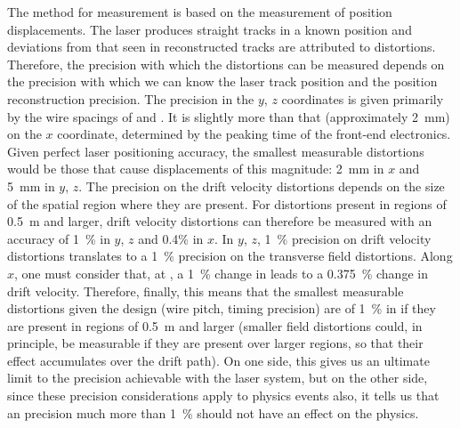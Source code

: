 The method for \efield measurement is based on the measurement of position displacements. The laser produces straight tracks in a known position and deviations from that seen in reconstructed tracks are attributed to \efield distortions. Therefore, the precision with which the \efield distortions can be measured depends on the precision with which we can know the laser track position and the  position reconstruction precision.
The  precision in the $y$, $z$ coordinates is given primarily by the wire spacings of \uvpitch and \xgpitch. It is slightly more than that (approximately \SI{2}{\milli\m}) on the $x$ coordinate, determined by the \fepeaktime peaking time of the front-end electronics.
Given perfect laser positioning accuracy, the smallest measurable \efield distortions would be those that cause displacements of this magnitude: \SI{2}{\milli\m} in $x$ and \SI{5}{\milli\m} in $y$, $z$. The precision on the drift velocity distortions depends on the size of the spatial region where they are present. For distortions present in regions of \SI{0.5}{\m} and larger, drift velocity distortions can therefore be measured with an accuracy of \SI{1}{\%} in $y$, $z$ and \num{0.4}\% in $x$. In $y$, $z$, \SI{1}{\%} precision on drift velocity distortions translates to a \SI{1}{\%} precision on the transverse field distortions. Along $x$, one must consider that, at \spmaxfield, a \SI{1}{\%} change in \efield leads to a \SI{0.375}{\%} change in drift velocity. Therefore, finally, this means that the smallest measurable distortions given the  design (wire pitch, timing precision) are of \SI{1}{\%} in \efield if they are present in regions of \SI{0.5}{\m} and larger (smaller field distortions could, in principle, be measurable if they are present over larger regions, so that their effect accumulates over the drift path).
On one side, this gives us an ultimate limit to the \efield precision achievable with the laser system, but on the other side, since these  precision considerations apply to physics events also, it tells us that an \efield precision much more than \SI{1}{\%} should not have an effect on the physics.

